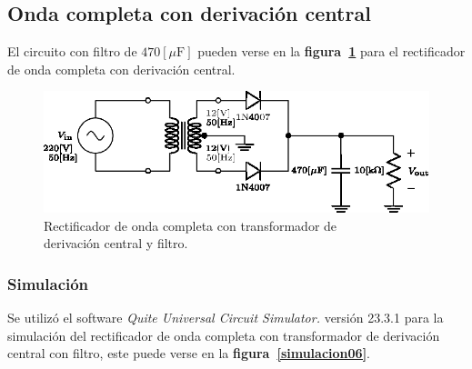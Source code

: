 \subsection{Onda completa con derivación central}
El circuito con filtro de $470[\mu\text{F}]$ pueden verse en la
\textbf{figura~\ref{circuito06}} para el rectificador de onda completa con
derivación central.

\begin{figure}[!h]
\centering
\includegraphics[scale=1]{diagramas/06.derivacion_central2.eps}
\caption{Rectificador de onda completa con transformador de \\
derivación central y filtro.}
\label{circuito06}
\end{figure}

\subsubsection{Simulación}
Se utilizó el software \emph{Quite Universal Circuit Simulator.} versión 23.3.1
para la simulación del rectificador de onda completa con transformador de
derivación central con filtro, este puede verse en la
\textbf{figura~\ref{simulacion06}}.


